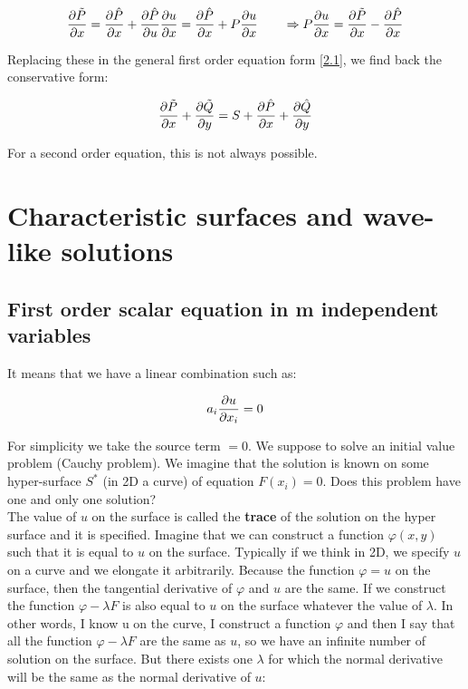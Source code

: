 \begin{equation}
\frac{\partial \tilde{P}}{\partial x} = \frac{\partial \hat{P}}{\partial x}  +\frac{\partial \hat{P}}{\partial u}\frac{\partial u}{\partial x}= \frac{\partial \hat{P}}{\partial x} + P\frac{\partial u}{\partial x} \qquad \Rightarrow P\frac{\partial u}{\partial x} = \frac{\partial \tilde{P}}{\partial x} - \frac{\partial \hat{P}}{\partial x}
\end{equation}

Replacing these in the general first order equation form \eqref{2.1}, we find back the conservative form: 

\begin{equation}
\frac{\partial \tilde{P}}{\partial x} + \frac{\partial \tilde{Q}}{\partial y} = S + \frac{\partial \hat{P}}{\partial x} + \frac{\partial \hat{Q}}{\partial y}
\end{equation}

For a second order equation, this is not always possible. 

\section{Characteristic surfaces and wave-like solutions}
\subsection{First order scalar equation in m independent variables}

It means that we have a linear combination such as: 

\begin{equation}
a_i \frac{\partial u}{\partial x_i} = 0 
\label{2.9}
\end{equation}

For simplicity we take the source term $=0$. We suppose to solve an initial value problem (Cauchy problem). We imagine that the solution is known on some hyper-surface $S^*$ (in 2D a curve) of equation $F(x_i) = 0$. Does this problem have one and only one solution? \\

The value of $u$ on the surface is called the \textbf{trace} of the solution on the hyper surface and it is specified. Imagine that we can construct a function $\varphi (x,y)$ such that it is equal to $u$ on the surface. Typically if we think in 2D, we specify $u$ on a curve and we elongate it arbitrarily. Because the function $\varphi = u$ on the surface, then the tangential derivative of $\varphi$ and $u$ are the same. If we construct the function $\varphi - \lambda F$ is also equal to $u$ on the surface whatever the value of $\lambda$. In other words, I know u on the curve, I construct a function $\varphi$ and then I say that all the function $\varphi - \lambda F$ are the same as $u$, so we have an infinite number of solution on the surface. But there exists one $\lambda$ for which the normal derivative will be the same as the normal derivative of $u$: 

